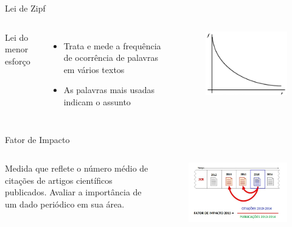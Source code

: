 \begin{frame}{Lei de Zipf}

	\begin{columns}
		Lei do menor esforço
		\begin{itemize}
			\item Trata e mede a frequência de ocorrência de palavras em vários textos
			\item As palavras mais usadas indicam o assunto
		\end{itemize}
		\begin{figure}[hb]
			\includegraphics[width=1\textwidth]{figures/zipflunh.png}
		\end{figure}
	\end{columns}

\end{frame}

\begin{frame}{Fator de Impacto}

	\begin{columns}
		\column{.6\textwidth}
		Medida que reflete o número médio de citações de artigos científicos publicados.
		Avaliar a importância de um dado periódico em sua área.
		\column{.4\textwidth}
		\begin{figure}[hb]
			\includegraphics[width=1\textwidth]{figures/fi.jpg}
		\end{figure}
	\end{columns}

\end{frame}

